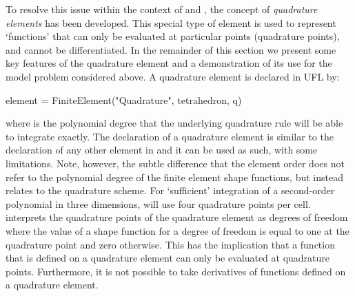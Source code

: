 To resolve this issue within the context of \ufl and \ffc, the concept
of \emph{quadrature elements}  has been developed.
This special type of element is used to represent `functions' that can only
be evaluated at particular points (quadrature points), and cannot be
differentiated. In the remainder of this section we present some key features
of the quadrature element and a demonstration of its use for the model problem
considered above.  A quadrature element is declared in UFL by:
%
\begin{python}
element = FiniteElement("Quadrature", tetrahedron, q)
\end{python}
%
where  is the polynomial degree that the underlying quadrature
rule will be able to integrate exactly.  The declaration of a quadrature
element is similar to the declaration of any other element in \ufl
and it can be used as such, with some limitations. Note, however,
the subtle difference that the element order does not refer to the
polynomial degree of the finite element shape functions, but instead
relates to the quadrature scheme.
For `sufficient' integration of a second-order
polynomial in three dimensions, \ffc{} will use four quadrature points
per cell.  \ffc{}
interprets the quadrature points of the quadrature element as degrees of
freedom where the value of a shape function for a degree of freedom is
equal to one at the quadrature point and zero otherwise.  This has the
implication that a function that is defined on a quadrature element can
only be evaluated at quadrature points.  Furthermore, it is not possible
to take derivatives of functions defined on a quadrature element.

